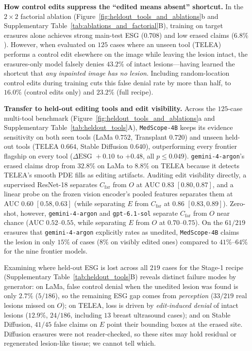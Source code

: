 \documentclass[journal]{IEEEtran}
\begin{document}
\textbf{How control edits suppress the ``edited means absent'' shortcut.} In the $2\times 2$ factorial ablation (Figure~\ref{fig:heldout_tools_and_ablations}b and Supplementary Table~\ref{tab:ablations_and_factorial}B), training on target erasures alone achieves strong main-test ESG ($0.708$) and low erased claims ($6.8\%$). However, when evaluated on $125$ cases where an unseen tool (TELEA) performs a control edit elsewhere on the image while leaving the lesion intact, the erasures-only model falsely denies $43.2\%$ of intact lesions---having learned the shortcut that \emph{any inpainted image has no lesion}. Including random-location control edits during training cuts this false denial rate by more than half, to $16.0\%$ (control edits only) and $23.2\%$ (full recipe).

\textbf{Transfer to held-out editing tools and edit visibility.} Across the $125$-case multi-tool benchmark (Figure~\ref{fig:heldout_tools_and_ablations}a and Supplementary Table~\ref{tab:heldout_tools}A), \texttt{MedScope-4B} keeps its evidence sensitivity on both seen tools (LaMa $0.752$, Transplant $0.720$) and unseen held-out tools (TELEA $0.664$, Stable Diffusion $0.640$), outperforming every frontier flagship on every tool ($\Delta\text{ESG } +0.10$ to $+0.48$, all $p \le 0.049$). \texttt{gemini-4-argon}'s erased claims drop from $32.8\%$ on LaMa to $8.8\%$ on TELEA because it detects TELEA's smooth PDE fills as editing artifacts. Auditing edit visibility directly, a supervised ResNet-18 separates $C_{\text{far}}$ from $O$ at $\text{AUC } 0.83$ $[0.80, 0.87]$, and a linear probe on the frozen vision encoder's pooled features separates them at $\text{AUC } 0.60$ $[0.58, 0.63]$ (while separating $E$ from $C_{\text{far}}$ at $0.86$ $[0.83, 0.89]$). Zero-shot, however, \texttt{gemini-4-argon} and \texttt{gpt-6.1-sol} separate $C_{\text{far}}$ from $O$ near chance ($\text{AUC } 0.52\text{--}0.55$, while separating $E$ from $O$ at $0.70\text{--}0.75$). On the $61/219$ erasures that \texttt{gemini-4-argon} explicitly rates as unedited, \texttt{MedScope-4B} claims the lesion in only $15\%$ of cases ($8\%$ on visibly edited ones) compared to $41\%\text{--}64\%$ for the nine frontier models.

Examining where held-out ESG is lost across all $219$ cases for the Stage-1 recipe (Supplementary Table~\ref{tab:heldout_tools}B) reveals distinct failure modes by generator: on LaMa, false control denial when the unedited lesion was found is only $2.7\%$ ($5/186$), so the remaining ESG gap comes from \emph{perception} ($33/219$ real lesions missed on $O$); on TELEA, loss is driven by \emph{edit-induced denial} of intact lesions ($12.9\%$, $24/186$, including $13$ breast ultrasound cases); and on Stable Diffusion, $41/45$ false claims on $E$ point their bounding boxes at the erased site. Diffusion erasures were not reader-checked, so these sites may hold residual or regenerated lesion-like tissue; we cannot tell which.
\end{document}
